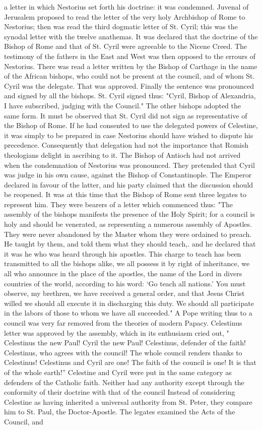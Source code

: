 a letter in which Nestorius set forth his doctrine: it was condemned. Juvenal of Jerusalem proposed to read the letter of the very holy Archbishop of Rome to Nestorius; then was read the third dogmatic letter of St. Cyril; this was the synodal letter with the twelve anathemas. It was declared that the doctrine of the Bishop of Rome and that of St. Cyril were agreeable to the Nicene Creed. The testimony of the fathers in the East and West was then opposed to the errours of Nestorius. There was read a letter written by the Bishop of Carthage in the name of the African bishops, who could not be present at the council, and of whom St. Cyril was the delegate. That was approved. Finally the sentence was pronounced and signed by all the bishops. St. Cyril signed thus: "Cyril, Bishop of Alexandria, I have subscribed, judging with the Council." The other bishops adopted the same form. It must be observed that St. Cyril did not sign as representative of the Bishop of Rome. If he had consented to use the delegated powers of Celestine, it was simply to be prepared in case Nestorius should have wished to dispute his precedence. Consequently that delegation had not the importance that Romish theologians delight in ascribing to it. The Bishop of Antioch had not arrived when the condemnation of Nestorius was pronounced. They pretended that Cyril was judge in his own cause, against the Bishop of Constantinople. The Emperor declared in favour of the latter, and his party claimed that the discussion should be reopened. It was at this time that the Bishop of Rome sent three legates to represent him. They were bearers of a letter which commenced thus: "The assembly of the bishops manifests the presence of the Holy Spirit; for a council is holy and should be venerated, as representing a numerous assembly of Apostles. They were never abandoned by the Master whom they were ordained to preach. He taught by them, and told them what they should teach,. and he declared that it was he who was heard through his apostles. This charge to teach has been transmitted to all the bishops alike, we all possess it by right of inheritance, we all who announce in the place of the apostles, the name of the Lord in divers countries of the world, according to his word: ‘Go teach all nations.’ You must observe, my brethren, we have received a general order, and that Jesus Christ willed we should all execute it in discharging this duty. We should all participate in the labors of those to whom we have all succeeded." A Pope writing thus to a council was very far removed from the theories of modern Papacy. Celestinus letter was approved by the assembly, which in its enthusiasm cried out, " Celestinus the new Paul! Cyril the new Paul! Celestinus, defender of the faith! Celestinus, who agrees with the council! The whole council renders thanks to Celestinus! Celestinus and Cyril are one! The faith of the council is one! It is that of the whole earth!” Celestine and Cyril were put in the same category as defenders of the Catholic faith. Neither had any authority except through the conformity of their doctrine with that of the council Instead of considering Celestine as having inherited a universal authority from St. Peter, they compare him to St. Paul, the Doctor-Apostle. The legates examined the Acts of the Council, and 